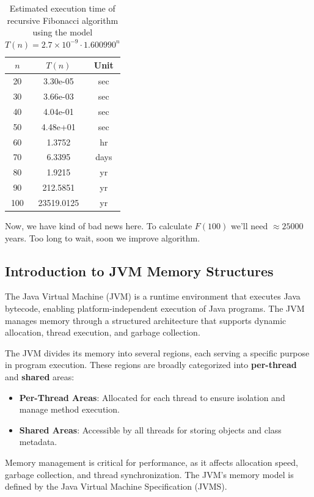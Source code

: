 \documentclass{article}
\begin{document}
\begin{table}[h]
	\centering
	\caption{Estimated execution time of recursive Fibonacci algorithm using the model $T(n) = 2.7 \times 10^{-9} \cdot 1.600990^n$}
	\begin{tabular}{|c|c|c|}
		\hline
		$n$ & $T(n)$ & Unit \\
		\hline
		20 & 3.30e-05 & sec \\ 
		\hline
		30 & 3.66e-03 & sec \\ 
		\hline
		40 & 4.04e-01 & sec \\ 
		\hline
		50 & 4.48e+01 & sec \\ 
		\hline
		60 & 1.3752 & hr \\ 
		\hline
		70 & 6.3395 & days \\ 
		\hline
		80 & 1.9215 & yr \\ 
		\hline
		90 & 212.5851 & yr \\ 
		\hline
		100 & 23519.0125 & yr \\ 
		\hline
		
	\end{tabular}
\end{table}

Now, we have kind of bad news here. To calculate $F(100)$ we'll need $\approx 25 000$ years. Too long to wait, soon we improve algorithm.

\subsection{Introduction to JVM Memory Structures}

The Java Virtual Machine (JVM) is a runtime environment that executes Java bytecode, enabling platform-independent execution of Java programs. The JVM manages memory through a structured architecture that supports dynamic allocation, thread execution, and garbage collection.


The JVM divides its memory into several regions, each serving a specific purpose in program execution. These regions are broadly categorized into \textbf{per-thread} and \textbf{shared} areas:
\begin{itemize}
	\item \textbf{Per-Thread Areas}: Allocated for each thread to ensure isolation and manage method execution.
	\item \textbf{Shared Areas}: Accessible by all threads for storing objects and class metadata.
\end{itemize}
Memory management is critical for performance, as it affects allocation speed, garbage collection, and thread synchronization. The JVM's memory model is defined by the Java Virtual Machine Specification (JVMS).
\end{document}
